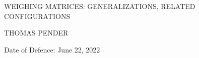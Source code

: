 \documentclass[../main]{subfiles}
\begin{document}
\begin{center}

 \thispagestyle{empty}
 
 \begin{large}
  \MakeUppercase{Weighing Matrices: Generalizations, related configurations}
 \end{large}

 \vspace{0.25in}
 
 \begin{large}
  \MakeUppercase{Thomas Pender}
 \end{large}
 
\end{center}
 
 \vspace{0.5in}
 
 Date of Defence: June 22, 2022
 
 \vspace{0.5in}
 
\end{document}
